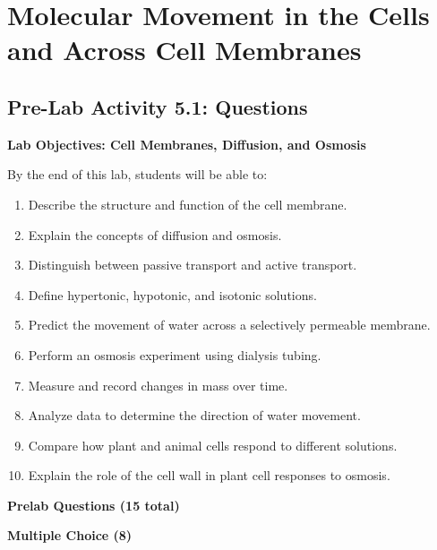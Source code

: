 \documentclass[
  letterpaper,
  DIV=11,
  numbers=noendperiod]{scrreprt}
\begin{document}

\chapter{\texorpdfstring{\textbf{Molecular Movement in the Cells and
Across Cell
Membranes}}{Molecular Movement in the Cells and Across Cell Membranes}}\label{molecular-movement-in-the-cells-and-across-cell-membranes}

\section{\texorpdfstring{\textbf{Pre-Lab Activity 5.1:
Questions}}{Pre-Lab Activity 5.1: Questions}}\label{pre-lab-activity-5.1-questions}

\textbf{Lab Objectives: Cell Membranes, Diffusion, and Osmosis}

By the end of this lab, students will be able to:

\begin{enumerate}
\def\labelenumi{\arabic{enumi}.}
\item
  Describe the structure and function of the cell membrane.
\item
  Explain the concepts of diffusion and osmosis.
\item
  Distinguish between passive transport and active transport.
\item
  Define hypertonic, hypotonic, and isotonic solutions.
\item
  Predict the movement of water across a selectively permeable membrane.
\item
  Perform an osmosis experiment using dialysis tubing.
\item
  Measure and record changes in mass over time.
\item
  Analyze data to determine the direction of water movement.
\item
  Compare how plant and animal cells respond to different solutions.
\item
  Explain the role of the cell wall in plant cell responses to osmosis.
\end{enumerate}

\textbf{Prelab Questions (15 total)}

\textbf{Multiple Choice (8)}
\end{document}

